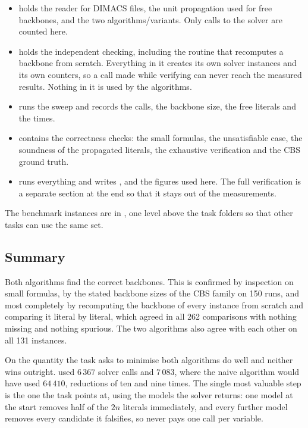 \documentclass[11pt,a4paper]{article}
\begin{document}
\begin{itemize}
  \item {} holds the reader for DIMACS files, the unit
  propagation used for free backbones, and the two algorithms/variants. Only
  calls to the solver are counted here.

  \item {} holds the independent checking, including the routine
  that recomputes a backbone from scratch. Everything in it creates its own
  solver instances and its own counters, so a call made while verifying can
  never reach the measured results. Nothing in it is used by the algorithms.

  \item {} runs the sweep and records the calls, the backbone
  size, the free literals and the times.

  \item {} contains the correctness checks: the small
  formulas, the unsatisfiable case, the soundness of the propagated literals,
  the exhaustive verification and the CBS ground truth.

  \item {} runs everything and writes ,
   and the figures used here. The full verification is a
  separate section at the end so that it stays out of the measurements.
\end{itemize}

The benchmark instances are in , one level above the
task folders so that other tasks can use the same set.

\subsection*{Summary}

Both algorithms find the correct backbones. This is confirmed by inspection on
small formulas, by the stated backbone sizes of the CBS family on 150 runs,
and most completely by recomputing the backbone of every instance from scratch
and comparing it literal by literal, which agreed in all 262 comparisons with
nothing missing and nothing spurious. The two algorithms also agree with each
other on all 131 instances.

On the quantity the task asks to minimise both algorithms do well and neither
wins outright.  used $6\,367$ solver calls and
 $7\,083$, where the naive algorithm would have used
$64\,410$, reductions of ten and nine times. The single most valuable step is
the one the task points at, using the models the solver returns: one model at
the start removes half of the $2n$ literals immediately, and every further
model removes every candidate it falsifies, so  never pays
one call per variable.
\end{document}

